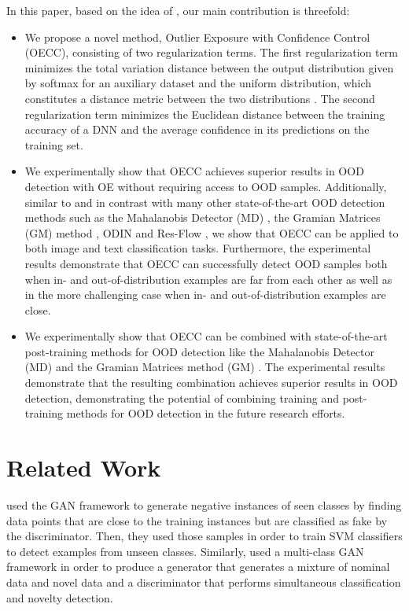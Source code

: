 \documentclass{article} \usepackage{iclr2020_conference,times}
\begin{document}
In this paper, based on the idea of \citep{hendrycks2019oe}, our main contribution is threefold:
\begin{itemize}
  \item We propose a novel method, Outlier Exposure with Confidence Control (OECC), consisting of two regularization terms. The first regularization term minimizes the total variation distance between the output distribution given by softmax for an auxiliary dataset and the uniform distribution, which constitutes a distance metric between the two distributions \citep{Gibbs02onchoosing, Deza.Deza2009EncyclopediaofDistances}. The second regularization term minimizes the Euclidean distance between the training accuracy of a DNN and the average confidence in its predictions on the training set.
  
  \item We experimentally show that OECC achieves superior results in OOD detection with OE without requiring access to OOD samples. Additionally, similar to \citep{hendrycks2019oe} and in contrast with many other state-of-the-art OOD detection methods such as the Mahalanobis Detector (MD) \citep{Lee:2018:SUF:3327757.3327819}, the Gramian Matrices (GM) method \citep{ch2019detecting}, ODIN \citep{2017arXiv170602690L} and Res-Flow \citep{Zisselman_2020_CVPR}, we show that OECC can be applied to both image and text classification tasks. Furthermore, the experimental results demonstrate that OECC can successfully detect OOD samples both when in- and out-of-distribution examples are far from each other as well as in the more challenging case when in- and out-of-distribution examples are close.
  
  \item We experimentally show that OECC can be combined with state-of-the-art post-training methods for OOD detection like the Mahalanobis Detector (MD) \citep{Lee:2018:SUF:3327757.3327819} and the Gramian Matrices method (GM) \citep{ch2019detecting}. The experimental results demonstrate that the resulting combination achieves superior results in OOD detection, demonstrating the potential of combining training and post-training
  methods for OOD detection in the future research efforts. 
\end{itemize}


\section{Related Work}
\citet{2017arXiv170508722Y} used the GAN framework \citep{Goodfellow:2014:GAN:2969033.2969125} to generate negative instances of seen classes by finding data points that are close to the training instances but are classified as fake by the discriminator. Then, they used those samples in order to train SVM classifiers to detect examples from unseen classes. Similarly, \citet{2018arXiv180210560K} used a multi-class GAN framework in order to produce a generator that generates a mixture of nominal data and novel data and a discriminator that performs simultaneous classification and novelty detection.
\end{document}
